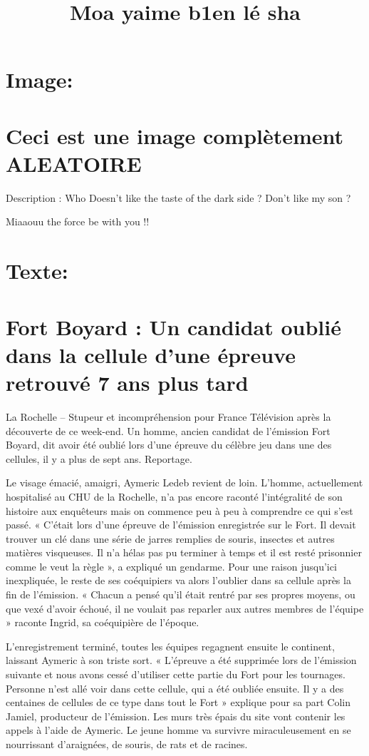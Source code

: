 \documentclass[11pt,a4paper]{article}
\title{Moa yaime b1en lé sha}
\begin{document}
\maketitle
\frame
{
\section*{Image: }
\section*{Ceci est une image complètement ALEATOIRE}
\frame
{
\href{http://lo21.jonathandekhtiar.eu/img/1.png}{}
}
Description : 
Who Doesn't like the taste of the dark side ?
Don't like my son ?

Miaaouu the force be with you !!

}
\frame
{
\section*{Texte: }
\section*{Fort Boyard : Un candidat oublié dans la cellule d’une épreuve retrouvé 7 ans plus tard }
La Rochelle – Stupeur et incompréhension pour France Télévision après la découverte de ce week-end. Un homme, ancien candidat de l’émission Fort Boyard, dit avoir été oublié lors d’une épreuve du célèbre jeu dans une des cellules, il y a plus de sept ans. Reportage.

Le visage émacié, amaigri, Aymeric Ledeb revient de loin. L’homme, actuellement hospitalisé au CHU de la Rochelle, n’a pas encore raconté l’intégralité de son histoire aux enquêteurs mais on commence peu à peu à comprendre ce qui s’est passé. « C’était lors d’une épreuve de l’émission enregistrée sur le Fort. Il devait trouver un clé dans une série de jarres remplies de souris, insectes et autres matières visqueuses. Il n’a hélas pas pu terminer à temps et il est resté prisonnier comme le veut la règle », a expliqué un gendarme. Pour une raison jusqu’ici inexpliquée, le reste de ses coéquipiers va alors l’oublier dans sa cellule après la fin de l’émission. « Chacun a pensé qu’il était rentré par ses propres moyens, ou que vexé d’avoir échoué, il ne voulait pas reparler aux autres membres de l’équipe » raconte Ingrid, sa coéquipière de l’époque.

L’enregistrement terminé, toutes les équipes regagnent ensuite le continent, laissant Aymeric à son triste sort. « L’épreuve a été supprimée lors de l’émission suivante et nous avons cessé d’utiliser cette partie du Fort pour les tournages. Personne n’est allé voir dans cette cellule, qui a été oubliée ensuite. Il y a des centaines de cellules de ce type dans tout le Fort » explique pour sa part Colin Jamiel, producteur de l’émission. Les murs très épais du site vont contenir les appels à l’aide de Aymeric. Le jeune homme va survivre miraculeusement en se nourrissant d’araignées, de souris, de rats  et de racines.

}
\end{document}
